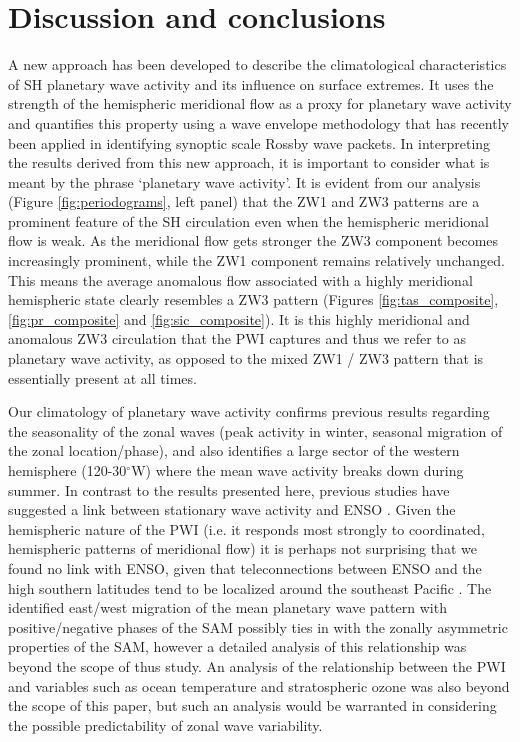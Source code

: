 \section{Discussion and conclusions}

A new approach has been developed to describe the climatological characteristics of SH planetary wave activity and its influence on surface extremes. It uses the strength of the hemispheric meridional flow as a proxy for planetary wave activity and quantifies this property using a wave envelope methodology that has recently been applied in identifying synoptic scale Rossby wave packets. In interpreting the results derived from this new approach, it is important to consider what is meant by the phrase `planetary wave activity'. It is evident from our analysis (Figure \ref{fig:periodograms}, left panel) that the ZW1 and ZW3 patterns are a prominent feature of the SH circulation even when the hemispheric meridional flow is weak. As the meridional flow gets stronger the ZW3 component becomes increasingly prominent, while the ZW1 component remains relatively unchanged. This means the average anomalous flow associated with a highly meridional hemispheric state clearly resembles a ZW3 pattern (Figures \ref{fig:tas_composite}, \ref{fig:pr_composite} and \ref{fig:sic_composite}). It is this highly meridional and anomalous ZW3 circulation that the PWI captures and thus we refer to as planetary wave activity, as opposed to the mixed ZW1 / ZW3 pattern that is essentially present at all times.  

Our climatology of planetary wave activity confirms previous results regarding the seasonality of the zonal waves (peak activity in winter, seasonal migration of the zonal location/phase), and also identifies a large sector of the western hemisphere (120-30$^{\circ}$W) where the mean wave activity breaks down during summer. In contrast to the results presented here, previous studies have suggested a link between stationary wave activity and ENSO \citep[e.g.][]{Trenberth1980,Raphael2003,Hobbs2007}. Given the hemispheric nature of the PWI (i.e. it responds most strongly to coordinated, hemispheric patterns of meridional flow) it is perhaps not surprising that we found no link with ENSO, given that teleconnections between ENSO and the high southern latitudes tend to be localized around the southeast Pacific \citep{Turner2004}. The identified east/west migration of the mean planetary wave pattern with positive/negative phases of the SAM possibly ties in with the zonally asymmetric properties of the SAM, however a detailed analysis of this relationship was beyond the scope of thus study. An analysis of the relationship between the PWI and variables such as ocean temperature and stratospheric ozone was also beyond the scope of this paper, but such an analysis would be warranted in considering the possible predictability of zonal wave variability.

